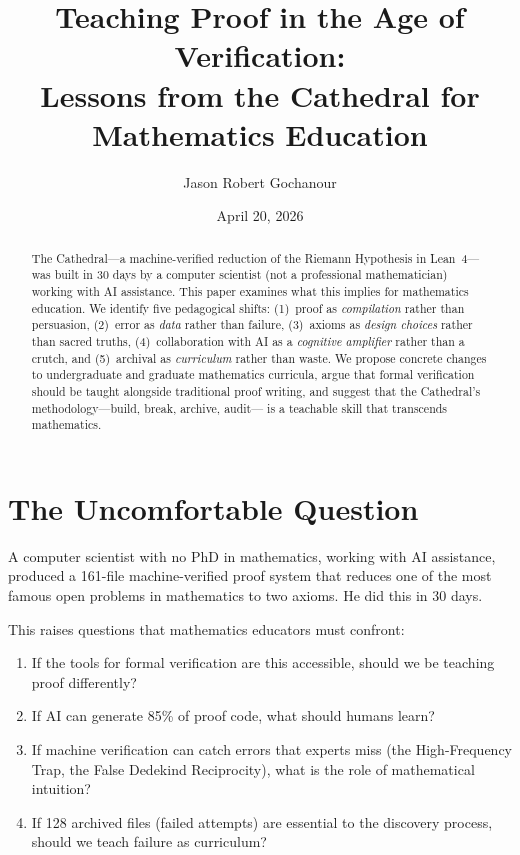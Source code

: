 \documentclass[11pt,a4paper]{article}
\title{%
  Teaching Proof in the Age of Verification:\\
  Lessons from the Cathedral for Mathematics Education%
}
\author{
  Jason Robert Gochanour
}
\date{April 20, 2026}
\begin{document}
\maketitle

\begin{abstract}
The Cathedral---a machine-verified reduction of the Riemann Hypothesis
in Lean~4---was built in 30 days by a computer scientist (not a
professional mathematician) working with AI assistance. This paper
examines what this implies for mathematics education. We identify
five pedagogical shifts: (1)~proof as \emph{compilation} rather than
persuasion, (2)~error as \emph{data} rather than failure,
(3)~axioms as \emph{design choices} rather than sacred truths,
(4)~collaboration with AI as a \emph{cognitive amplifier} rather
than a crutch, and (5)~archival as \emph{curriculum} rather
than waste. We propose concrete changes to undergraduate and
graduate mathematics curricula, argue that formal verification
should be taught alongside traditional proof writing, and suggest
that the Cathedral's methodology---build, break, archive, audit---
is a teachable skill that transcends mathematics.
\end{abstract}

\tableofcontents

\section{The Uncomfortable Question}

A computer scientist with no PhD in mathematics, working with AI
assistance, produced a 161-file machine-verified proof system that
reduces one of the most famous open problems in mathematics to two
axioms. He did this in 30 days.

This raises questions that mathematics educators must confront:

\begin{enumerate}
  \item If the tools for formal verification are this accessible,
    should we be teaching proof differently?
  \item If AI can generate 85\% of proof code, what should humans
    learn?
  \item If machine verification can catch errors that experts miss
    (the High-Frequency Trap, the False Dedekind Reciprocity), what
    is the role of mathematical intuition?
  \item If 128 archived files (failed attempts) are essential to the
    discovery process, should we teach failure as curriculum?
\end{enumerate}
\end{document}
